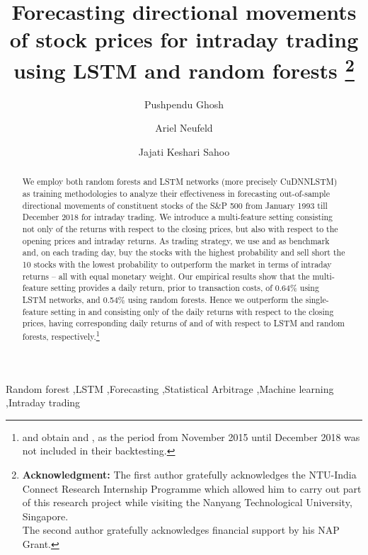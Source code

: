 \documentclass[review]{elsarticle}
\begin{document}
\begin{frontmatter}

\title{Forecasting directional movements of stock prices for intraday trading\\ using LSTM and random forests
	\footnote{
		\noindent
		\textbf{Acknowledgment:} The first author gratefully acknowledges the NTU-India Connect Research Internship Programme which allowed him to carry out part of this research project while visiting the Nanyang Technological University, Singapore.\\
		The second author gratefully acknowledges financial support by his NAP Grant.}
	}


\author[add1]{Pushpendu Ghosh}
\author[add2]{Ariel Neufeld}
\author[add3]{Jajati Keshari Sahoo}


\address[add1]{Department of Computer Science  Information Systems, BITS Pilani K.K.Birla Goa campus, India}
\address[add2]{Division of Mathematical Sciences, Nanyang Technological University, Singapore}
\address[add3]{Department of Mathematics, BITS Pilani K.K.Birla Goa campus, India}

\begin{abstract}
	We employ both random forests  and LSTM networks (more precisely CuDNNLSTM)  as training methodologies to analyze their effectiveness in forecasting out-of-sample directional movements of constituent stocks of the S\&P 500 from January 1993 till December 2018 for intraday trading.
We introduce a multi-feature setting consisting not only of the returns with respect to the closing prices, but also with respect to the opening prices and intraday returns. 
As trading strategy, we use \cite{krauss17} and \cite{krauss18} as benchmark and, on each trading day, buy the  stocks with the highest probability and sell short the 10 stocks with the lowest probability 
	to outperform  the market in terms of intraday returns -- all with equal monetary weight. 
Our empirical results show that the multi-feature setting provides a daily return, prior to transaction costs, of 0.64\% using LSTM networks, and 0.54\% using random forests. Hence we outperform the single-feature setting in \cite{krauss18} and \cite{krauss17}
	consisting only of 
	the daily returns with respect to the closing prices, having corresponding daily returns of   and of  with respect to LSTM and random forests, respectively.\footnote{\cite{krauss18} and  \cite{krauss17} obtain  and , as the period from November 2015 until December 2018 was not included in their backtesting.}


	
\end{abstract}

\begin{keyword}
Random forest \sep LSTM  \sep Forecasting \sep Statistical Arbitrage \sep Machine learning \sep Intraday trading



\end{keyword}
\end{frontmatter}
\end{document}
